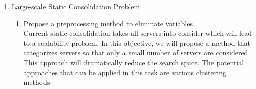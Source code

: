 \begin{enumerate}
	\item Large-scale Static Consolidation Problem
	\begin{enumerate}
		\item Propose a preprocessing method to eliminate variables \\
		Current static consolidation takes all servers into consider which will lead to a scalability problem. In this objective, we will propose a method that categorizes servers so that only a small number of servers are considered. This approach will dramatically reduce the search space. The potential approaches that can be applied in this task are various clustering methods.
	\end{enumerate}
\end{enumerate}


